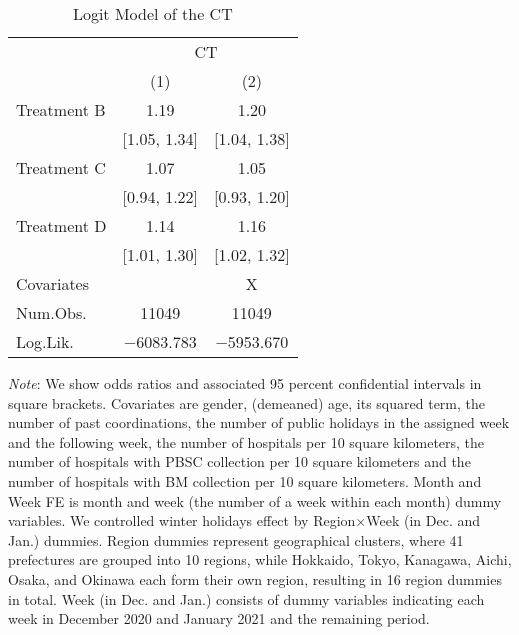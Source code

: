 \documentclass[12pt, a4paper]{article}
\begin{document}
\begin{table}[H]

\caption{\label{tab:test-logit}Logit Model of the CT}
\centering
\fontsize{8}{10}\selectfont
\begin{threeparttable}
\begin{tabular}[t]{lcc}
\toprule
\multicolumn{1}{c}{ } & \multicolumn{2}{c}{CT} \\
\cmidrule(l{3pt}r{3pt}){2-3}
  & (1) & (2)\\
\midrule
Treatment B & \num{1.19} & \num{1.20}\\
 & {}[\num{1.05}, \num{1.34}] & {}[\num{1.04}, \num{1.38}]\\
Treatment C & \num{1.07} & \num{1.05}\\
 & {}[\num{0.94}, \num{1.22}] & {}[\num{0.93}, \num{1.20}]\\
Treatment D & \num{1.14} & \num{1.16}\\
 & {}[\num{1.01}, \num{1.30}] & {}[\num{1.02}, \num{1.32}]\\
\midrule
Covariates &  & X\\
Num.Obs. & \num{11049} & \num{11049}\\
Log.Lik. & \num{-6083.783} & \num{-5953.670}\\
\bottomrule
\end{tabular}
\begin{tablenotes}
\item \emph{Note}: We show odds ratios and associated 95 percent confidential intervals in square brackets. Covariates are gender, (demeaned) age, its squared term, the number of past coordinations, the number of public holidays in the assigned week and the following week, the number of hospitals per 10 square kilometers, the number of hospitals with PBSC collection per 10 square kilometers and the number of hospitals with BM collection per 10 square kilometers. Month and Week FE is month and week (the number of a week within each month) dummy variables. We controlled winter holidays effect by Region$\times$Week (in Dec. and Jan.) dummies. Region dummies represent geographical clusters, where 41 prefectures are grouped into 10 regions, while Hokkaido, Tokyo, Kanagawa, Aichi, Osaka, and Okinawa each form their own region, resulting in 16 region dummies in total. Week (in Dec. and Jan.) consists of dummy variables indicating each week in December 2020 and January 2021 and the remaining period.
\end{tablenotes}
\end{threeparttable}
\end{table}
\end{document}
